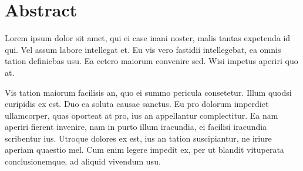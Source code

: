 \section*{Abstract}

Lorem ipsum dolor sit amet, qui ei case inani noster, malis tantas expetenda id qui. Vel assum labore intellegat et. Eu vis vero fastidii intellegebat, ea omnis tation definiebas usu. Ea cetero maiorum convenire sed. Wisi impetus aperiri quo at.

Vis tation maiorum facilisis an, quo ei summo pericula consetetur. Illum quodsi euripidis ex est. Duo ea soluta causae sanctus. Eu pro dolorum imperdiet ullamcorper, quas oporteat at pro, ius an appellantur complectitur. Ea nam aperiri fierent invenire, nam in purto illum iracundia, ei facilisi iracundia scribentur ius. Utroque dolores ex est, ius an tation suscipiantur, ne iriure aperiam quaestio mel. Cum enim legere impedit ex, per ut blandit vituperata conclusionemque, ad aliquid vivendum usu.
\newline
